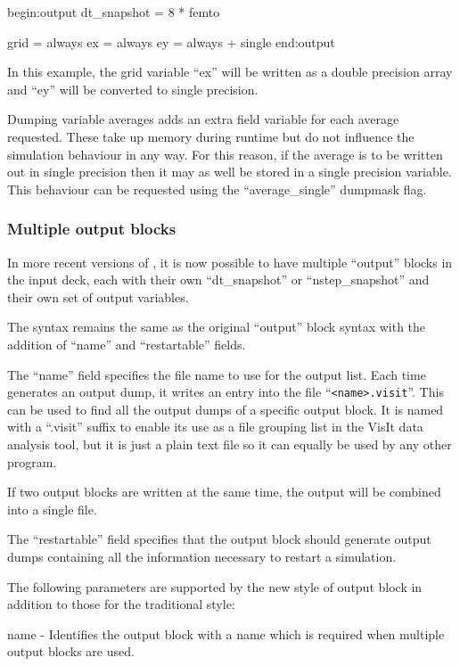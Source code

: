 \begin{boxverbatim}
begin:output
   dt_snapshot = 8 * femto

   grid = always
   ex = always
   ey = always + single
end:output
\end{boxverbatim}

In this example, the grid variable ``ex'' will be written as a
double precision array and ``ey'' will be converted to single
precision.

Dumping variable averages adds an extra field variable for each average
requested. These take up memory during runtime but do not influence the
simulation behaviour in any way. For this reason, if the average is to be
written out in single precision then it may as well be stored in a single
precision variable. This behaviour can be requested using the
``average\_single'' dumpmask flag.


\subsubsection{Multiple output blocks}
\label{sec:multiple_output}

In more recent versions of {\EPOCH}, it is now possible to have multiple
``output'' blocks in the input deck,
each with their own ``dt\_snapshot'' or ``nstep\_snapshot'' and their
own set of output variables.

The syntax remains the same as the original ``output'' block syntax with the
addition of ``name'' and ``restartable'' fields.

The ``name'' field specifies the file name to use for the output list. Each
time {\EPOCH} generates an output dump, it writes an entry into the file
``\verb|<name>.visit|''. This can be used to find all the output dumps of a
specific output block. It is named with a ``.visit'' suffix to enable its use as
a file grouping list in the VisIt data analysis tool, but it is just a plain
text file so it can equally be used by any other program.

If two output blocks are written at the same time, the output will be combined
into a single file.

The ``restartable'' field specifies that the output block should
generate output dumps containing all the information necessary
to restart a simulation.

The following parameters are supported by the new style of output block in
addition to those for the traditional style:

{\emphtext name} - Identifies the output block with a name which is required
  when multiple output blocks are used.\\

